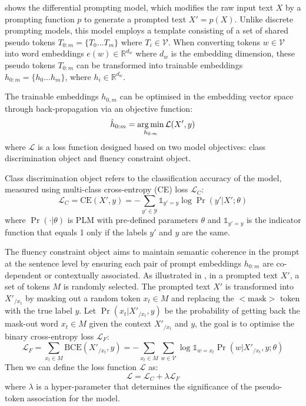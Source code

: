  shows the differential prompting model, which modifies the raw input text $X$ by a prompting function $p$ to generate a prompted text $X' = p(X)$. Unlike discrete prompting models, this model employs a template consisting of a set of shared pseudo tokens $T_{0:m} = \{T_0...T_m\}$ where $T_i \in \mathcal{V}$. When converting tokens $w \in \mathcal{V}$ into word embeddings $e(w) \in \mathbb{R}^{d_w}$ where $d_w$ is the embedding dimension, these pseudo tokens $T_{0:m}$ can be transformed into trainable embeddings $h_{0:m} = \{h_0...h_m\}$, where $h_i \in \mathbb{R}^{d_w}$. 

The trainable embeddings $h_{0,m}$ can be optimised in the embedding vector space through back-propagation via an objective function:
\begin{equation}
    \hat{h}_{0:m} = \operatorname*{arg\,min}_{h_{0:m}} \mathcal{L}(X', y)
\end{equation}
where $\mathcal{L}$ is a loss function designed based on two model objectives: class discrimination object and fluency constraint object.

Class discrimination object refers to the classification accuracy of the model, measured using multi-class cross-entropy (CE) loss $\mathcal{L}_C$:
\begin{equation}
    \mathcal{L}_C = \text{CE}(X', y) = - \sum_{y' \in \mathcal{Y}} \mathds{1}_{y' = y} \log \Pr(y'|X'; \theta)
\end{equation}
where $\Pr(\cdot|\theta)$ is PLM with pre-defined parameters $\theta$ and $\mathds{1}_{y'=y}$ is the indicator function that equals 1 only if the labels $y'$ and $y$ are the same.

The fluency constraint object aims to maintain semantic coherence in the prompt at the sentence level by ensuring each pair of prompt embeddings $h_{0:m}$ are co-dependent or contextually associated. As illustrated in , in a prompted text $X'$, a set of tokens $M$ is randomly selected. The prompted text $X'$ is transformed into ${X'}_{/{x_t}}$ by masking out a random token $x_t \in M$ and replacing the $<$$\text{mask}$$>$ token with the true label $y$. Let $\Pr(x_t|{X'}_{/{x_t}}, y)$ be the probability of getting back the mask-out word $x_t \in M$ given the context ${X'}_{/{x_t}}$ and $y$, the goal is to optimise the binary cross-entropy loss $\mathcal{L}_F$:
\begin{equation}
    \mathcal{L}_F = \sum_{x_t \in M} \text{BCE}({X'}_{/{x_t}}, y) = - \sum_{x_t \in M} \sum_{w \in \mathcal{V}} \log \mathds{1}_{w=x_t} \Pr(w|{X'}_{/{x_t}}, y; \theta)
\end{equation}
Then we can define the loss function $\mathcal{L}$ as:
\begin{equation}
    \mathcal{L} = \mathcal{L}_C + \lambda \mathcal{L}_F
\end{equation}
where $\lambda$ is a hyper-parameter that determines the significance of the pseudo-token association for the model.

